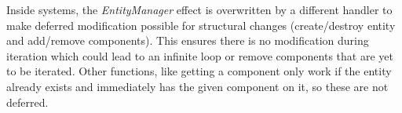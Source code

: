 Inside systems, the \textit{EntityManager} effect is overwritten by a different handler to make deferred modification possible for structural changes (create/destroy entity and add/remove components). This ensures there is no modification during iteration which could lead to an infinite loop or remove components that are yet to be iterated. Other functions, like getting a component only work if the entity already exists and immediately has the given component on it, so these are not deferred.
